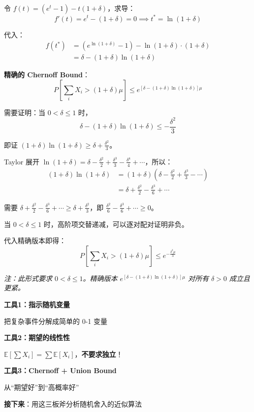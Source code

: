 \documentclass[12pt, a4paper]{ctexart}
\begin{document}
\begin{blackboard}

令 $f(t) = (e^t - 1) - t(1+\delta)$，求导：
\[
f'(t) = e^t - (1+\delta) = 0 \implies t^* = \ln(1+\delta)
\]

代入：
\begin{align*}
f(t^*) &= (e^{\ln(1+\delta)} - 1) - \ln(1+\delta) \cdot (1+\delta) \\
&= \delta - (1+\delta)\ln(1+\delta)
\end{align*}

\textbf{精确的 Chernoff Bound}：
\[
\boxed{P\left[\sum_i X_i > (1+\delta)\mu\right] \leq e^{\left[\delta - (1+\delta)\ln(1+\delta)\right]\mu}}
\]

\end{blackboard}

\begin{blackboard}

需要证明：当 $0 < \delta \leq 1$ 时，
\[
\delta - (1+\delta)\ln(1+\delta) \leq -\frac{\delta^2}{3}
\]

即证 $(1+\delta)\ln(1+\delta) \geq \delta + \frac{\delta^2}{3}$。

Taylor 展开 $\ln(1+\delta) = \delta - \frac{\delta^2}{2} + \frac{\delta^3}{3} - \frac{\delta^4}{4} + \cdots$，所以：
\begin{align*}
(1+\delta)\ln(1+\delta) &= (1+\delta)\left(\delta - \frac{\delta^2}{2} + \frac{\delta^3}{3} - \cdots\right) \\
&= \delta + \frac{\delta^2}{2} - \frac{\delta^3}{6} + \cdots
\end{align*}

需要 $\delta + \frac{\delta^2}{2} - \frac{\delta^3}{6} + \cdots \geq \delta + \frac{\delta^2}{3}$，即 $\frac{\delta^2}{6} - \frac{\delta^3}{6} + \cdots \geq 0$。

当 $0 < \delta \leq 1$ 时，高阶项交替递减，可以逐对配对证明非负。

代入精确版本即得：
\[
\boxed{P\left[\sum_i X_i > (1+\delta)\mu\right] \leq e^{-\frac{\delta^2\mu}{3}}}
\]

\textit{注：此形式要求 $0 < \delta \leq 1$。精确版本 $e^{[\delta-(1+\delta)\ln(1+\delta)]\mu}$ 对所有 $\delta > 0$ 成立且更紧。}

\end{blackboard}

\begin{insight}[随机化分析的三板斧]

\textbf{工具1：指示随机变量}

把复杂事件分解成简单的 0-1 变量

\textbf{工具2：期望的线性性}

$\mathbb{E}[\sum X_i] = \sum \mathbb{E}[X_i]$，\textbf{不要求独立}！

\textbf{工具3：Chernoff + Union Bound}

从``期望好''到``高概率好''

\textbf{接下来}：用这三板斧分析随机舍入的近似算法

\end{insight}
\end{document}

